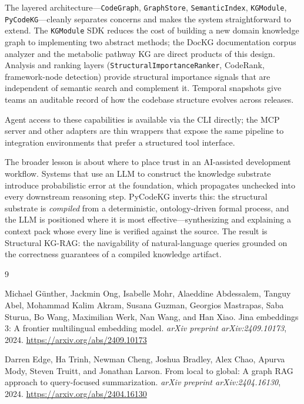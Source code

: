 \documentclass[10pt]{article}
\begin{document}
The layered architecture---\texttt{CodeGraph}, \texttt{GraphStore},
\texttt{SemanticIndex}, \texttt{KGModule}, \texttt{PyCodeKG}---cleanly separates
concerns and makes the system straightforward to extend.  The \texttt{KGModule}
SDK reduces the cost of building a new domain knowledge graph to implementing
two abstract methods; the DocKG documentation corpus analyzer and the
metabolic pathway KG are direct products of this design.
Analysis and ranking layers (\texttt{StructuralImportanceRanker}, CodeRank,
framework-node detection) provide structural importance signals that are
independent of semantic search and complement it.  Temporal snapshots give
teams an auditable record of how the codebase structure evolves across releases.

Agent access to these capabilities is available via the CLI directly; the
MCP server and other adapters are thin wrappers that expose the same pipeline
to integration environments that prefer a structured tool interface.

The broader lesson is about where to place trust in an AI-assisted development
workflow. Systems that use an LLM to construct the knowledge substrate introduce
probabilistic error at the foundation, which propagates unchecked into every
downstream reasoning step. PyCodeKG inverts this: the structural substrate is
\emph{compiled} from a deterministic, ontology-driven formal process, and the LLM
is positioned where it is most effective---synthesizing and explaining a context
pack whose every line is verified against the source. The result is Structural
KG-RAG: the navigability of natural-language queries grounded on the correctness
guarantees of a compiled knowledge artifact.

\begin{thebibliography}{9}

Michael Günther, Jackmin Ong, Isabelle Mohr, Alaeddine Abdessalem,
Tanguy Abel, Mohammad Kalim Akram, Susana Guzman, Georgios Mastrapas,
Saba Sturua, Bo Wang, Maximilian Werk, Nan Wang, and Han Xiao.
\newblock Jina embeddings 3: A frontier multilingual embedding model.
\newblock \emph{arXiv preprint arXiv:2409.10173}, 2024.
\newblock \url{https://arxiv.org/abs/2409.10173}

Darren Edge, Ha Trinh, Newman Cheng, Joshua Bradley, Alex Chao, Apurva Mody,
Steven Truitt, and Jonathan Larson.
\newblock From local to global: A graph {RAG} approach to query-focused
summarization.
\newblock \emph{arXiv preprint arXiv:2404.16130}, 2024.
\newblock \url{https://arxiv.org/abs/2404.16130}

\end{thebibliography}
\end{document}
